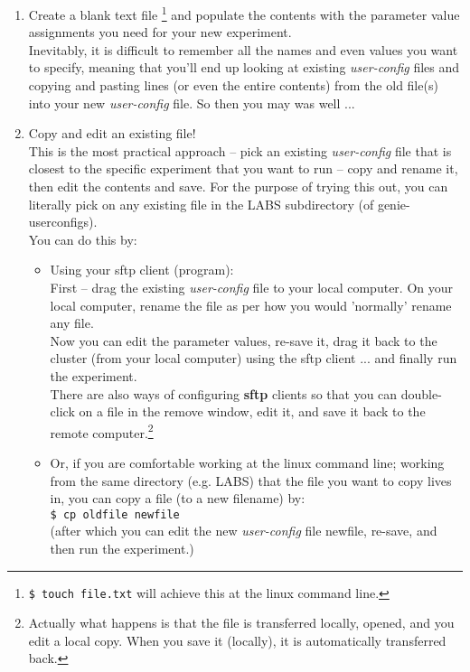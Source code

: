\begin{enumerate}[noitemsep]

\vspace{1mm}
\item Create a blank text file \footnote{\texttt{\$ touch file.txt} will achieve this at the linux command line.} and populate the contents with the parameter value assignments you need for your new experiment.
\\Inevitably, it is difficult to remember all the names and even values you want to specify, meaning that you'll end up looking at existing \textit{user-config} files and copying and pasting lines (or even the entire contents) from the old file(s) into your new \textit{user-config} file. So then you may was well ...

\vspace{1mm}
\item Copy and edit an existing file!
\\This is the most practical approach -- pick an existing \textit{user-config} file that is closest to the specific experiment that you want to run -- copy and rename it, then edit the contents and save. For the purpose of trying this out, you can literally pick on any existing file in the \textsf{\footnotesize LABS } subdirectory (of \textsf{\footnotesize genie-userconfigs}).
\vspace{1mm}
\\ You can do this by:
\begin{itemize}[noitemsep]
\vspace{1mm}
\item Using your sftp client (program):
\\First -- drag the existing \textit{user-config} file to your local computer. On your local computer, rename the file as per how you would 'normally' rename any file. 
\\Now you can edit the parameter values, re-save it, drag it back to the cluster (from your local computer) using the sftp client ... and finally run the experiment.
\\There are also ways of configuring \textbf{sftp} clients so that you can double-click on a file in the remove window, edit it, and save it back to the remote computer.\footnote{Actually what happens is that the file is transferred locally, opened, and you edit a local copy. When you save it (locally), it is automatically transferred back.} 
\vspace{1mm}
\item Or, if you are comfortable working at the linux command line; working from the same directory (e.g. \textsf{\footnotesize LABS}) that the file you want to copy lives in, you can copy a file (to a new filename) by:
\\\texttt{\small \$ cp oldfile newfile }
\\(after which you can edit the new \textit{user-config} file \textsf{\footnotesize newfile}, re-save, and then run the experiment.)
\end{itemize}
\vspace{1mm}

\end{enumerate}


